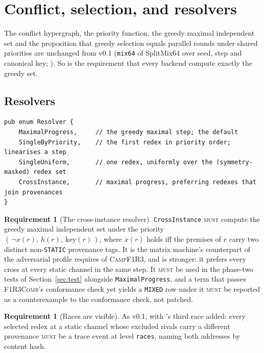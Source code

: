 \documentclass[11pt,a4paper]{article}
\newcommand{\code}[1]{\texttt{#1}}
\newcommand{\Comb}{\textsc{F1R3Comb}}
\newcommand{\Camp}{\textsc{CampF1R3}}
\newcommand{\MUST}{\textsc{must}}
\theoremstyle{definition}
\newtheorem{requirement}[definition]{Requirement}
\theoremstyle{plain}
\begin{document}
\section{Conflict, selection, and resolvers}\label{sec:select}

The conflict hypergraph, the priority function, the greedy maximal independent
set and the proposition that greedy selection equals parallel rounds under
shared priorities are unchanged from v0.1 (\code{mix64} of SplitMix64 over
seed, step and canonical key; \cite{bfs}). So is the requirement that every
backend compute exactly the greedy set.

\subsection{Resolvers}\label{sec:resolvers}

\begin{lstlisting}
pub enum Resolver {
    MaximalProgress,     // the greedy maximal step; the default
    SingleByPriority,    // the first redex in priority order; linearises a step
    SingleUniform,       // one redex, uniformly over the (symmetry-masked) redex set
    CrossInstance,       // maximal progress, preferring redexes that join provenances
}
\end{lstlisting}

\begin{requirement}[The cross-instance resolver]\label{req:cross}
\code{CrossInstance} \MUST{} compute the greedy maximal independent set under
the priority $(\,\neg x(r),\ h(r),\ \mathrm{key}(r)\,)$, where $x(r)$ holds
iff the premises of $r$ carry two distinct non-\code{STATIC} provenance tags.
It is the matrix machine's counterpart of the adversarial profile
\cite[Obl.~11.2]{combspec} requires of \Camp, and is stronger: it prefers
every cross at every static channel in the same step. It \MUST{} be used in
the phase-two tests of Section~\ref{sec:test} alongside
\code{MaximalProgress}, and a term that passes \Comb's conformance check
\cite[Req.~5.14]{combspec} yet yields a \code{MIXED} row under it \MUST{} be
reported as a counterexample to the conformance check, not patched.
\end{requirement}

\begin{requirement}[Races are visible]\label{req:races}
As v0.1, with \cite[Req.~9.8]{combspec}'s third race added: every selected
redex at a static channel whose excluded rivals carry a different provenance
\MUST{} be a trace event at level \code{races}, naming both addresses by
content hash.
\end{requirement}
\end{document}
